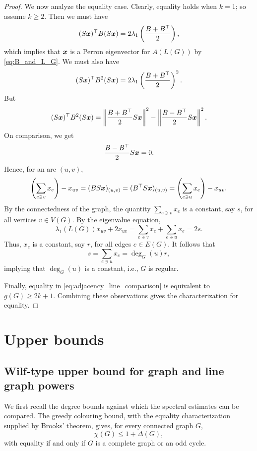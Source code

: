 \documentclass[10pt,a4paper]{article}
\theoremstyle{plain}
\numberwithin{equation}{section}
\def\x{\mbox{\boldmath $x$}}
\begin{document}
\begin{proof}
We now analyze the equality case. Clearly, equality holds when $k=1$; so assume $k\ge 2$. Then we must have
\[ (S\x)^\top B (S\x) = 2 \lambda_1\left(\frac{B+B^\top}{2}\right),\]
which implies that $\x$ is a Perron eigenvector for $A(L(G))$ by \eqref{eq:B_and_L_G}. We must also have
\[ (S\x)^\top B^2 (S\x) = 2 \lambda_1\left(\frac{B+B^\top}{2}\right)^2. \]
But 
\[(S\x)^\top B^2 (S\x) = \left\|\frac{B+B^\top}{2}S\x\right\|^2 - \left\|\frac{B-B^\top}{2}S\x \right\|^2.\]
On comparison, we get 
\[ \frac{B-B^\top}{2}S\x  = 0.\]
Hence, for an arc $(u,v)$, 
\[\left(\sum_{ e\ni v} x_e \right) - x_{uv} = (BS\x)_{(u,v)} = (B^\top S\x)_{(u,v)} = \left(\sum_{ e\ni u} x_e \right) - x_{uv}.\]
By the connectedness of the graph, the quantity $\sum_{ e\ni v} x_e$ is a constant, say $s$, for all vertices $v\in V(G)$. By the eigenvalue equation, 
\[\lambda_1(L(G))x_{uv} + 2x_{uv} = \sum_{ e\ni v}x_e + \sum_{ e\ni u}x_e =2s.\]
Thus, $x_{e}$ is a constant, say $r$, for all edges $e\in E(G)$. It follows that 
\[s = \sum_{e\ni u} x_e = \deg_G(u)r,\]
implying that $\deg_G(u)$ is a constant, i.e., $G$ is regular. 

Finally, equality in \eqref{eq:adjacency_line_comparison} is equivalent to $g(G)\ge 2k+1$. Combining these observations gives the characterization for equality. 
\end{proof}


\section{Upper bounds} \label{sec:wilfspectrarelated}


\subsection{Wilf-type upper bound for graph and line graph powers}

We first recall the degree bounds against which the spectral estimates can be compared. The greedy colouring bound, with the equality characterization supplied by Brooks' theorem, gives, for every connected graph $G$,
\begin{equation}\label{eq:Brooks}
  \chi(G)\le 1 + \Delta(G), 
\end{equation}
with equality if and only if $G$ is a complete graph or an odd cycle.
\end{document}
